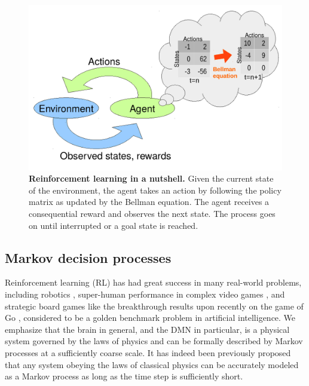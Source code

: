 \documentclass[10pt,letterpaper]{article}
\begin{document}
\begin{figure}[!h]
  \centering
  \includegraphics[width=1.\linewidth]{rl2.pdf}
  \caption{\textbf{Reinforcement learning in a nutshell.} Given the current state of the environment,
    the agent takes an action by following the policy matrix as updated by the Bellman equation. The agent receives a consequential reward and observes the next state. The process goes on until interrupted or a goal state is reached.}
  \label{fig:rl}
\end{figure}

\subsection{Markov decision processes}
Reinforcement learning (RL) has had great success in many real-world problems, including robotics \citep{ng2004,abbeel2004},
super-human performance in complex video games \citep{mnih2015},
and strategic board games like the breakthrough results upon recently on the game of Go \citep{silver2016mastering}, considered to be a golden benchmark problem in artificial intelligence.
We emphasize that the brain in general, and the DMN in particular,
is a physical system governed by the laws of
physics and can be formally described
by Markov processes at a sufficiently coarse scale.
It has indeed been previously proposed \citep{tegmark2016improved} that
any system obeying the laws of classical physics can be accurately modeled as a Markov process as long as the time
step is sufficiently short.
\end{document}

